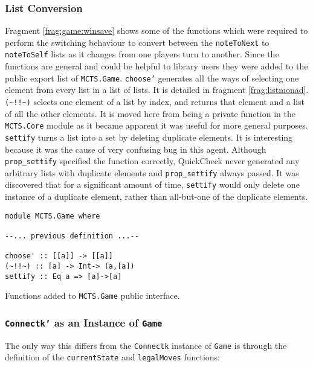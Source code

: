 \subsubsection{List Conversion}
Fragment \ref{frag:game:winsave} shows some of the functions which were required to perform the switching behaviour to convert between the \texttt{noteToNext} to \texttt{noteToSelf} lists as it changes from one players turn to another. Since the functions are general and could be helpful to library users they were added to the public export list of \texttt{MCTS.Game}. \texttt{choose'} generates all the ways of selecting one element from every list in a list of lists. It is detailed in fragment \ref{frag:listmonad}. \verb|(~!!~)| selects one element of a list by index, and returns that element and a list of all the other elements. It is moved here from being a private function in the \texttt{MCTS.Core} module as it became apparent it was useful for more general purposes. \texttt{settify} turns a list into a set by deleting duplicate elements. It is interesting because it was the cause of very confusing bug in this agent.  Although \texttt{prop\_settify} specified the function correctly, {QuickCheck} never generated any arbitrary lists with duplicate elements and \texttt{prop\_settify} always passed. It was discovered that for a significant amount of time, \texttt{settify} would only delete one instance of a duplicate element, rather than all-but-one of the duplicate elements.
\begin{fragment}
\begin{lstlisting}
module MCTS.Game where

--... previous definition ...--

choose' :: [[a]] -> [[a]]
(~!!~) :: [a] -> Int-> (a,[a])
settify :: Eq a => [a]->[a]
\end{lstlisting}
\caption{\label{frag:game:winsave}Functions added to \texttt{MCTS.Game} public interface.}
\end{fragment}

\subsubsection{\texttt{Connectk'} as an Instance of \texttt{Game}}
The only way this differs from the \texttt{Connectk} instance of \texttt{Game} is through the definition of the \texttt{currentState} and \texttt{legalMoves} functions:

